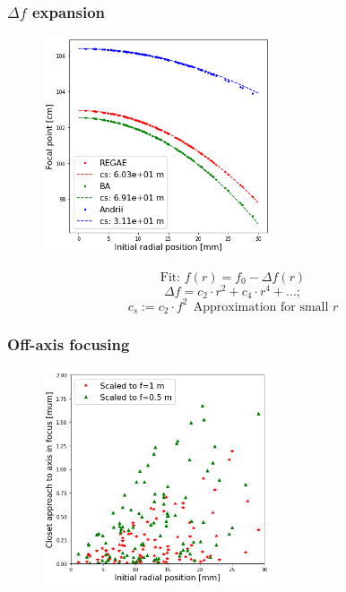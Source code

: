 \documentclass{beamer}
\begin{document}
\begin{frame}
  \frametitle{$\Delta f$ expansion}
  \begin{figure}
      \includegraphics[width=0.6\textwidth]{cs_fit_example}
  \end{figure}
  \[ \text{Fit: } f(r) = f_0 - \Delta f(r)\]
  \[
    \Delta f = c_2\cdot r^2 + c_4\cdot r^4 + ...;\]
\[    c_s := c_2\cdot f^2\ \ \text{Approximation for small }r
  \]
\end{frame}

\begin{frame}
  \frametitle{Off-axis focusing}
  \begin{figure}
      \includegraphics[width=0.6\textwidth]{weird_rmin}
  \end{figure}

\end{frame}






\end{document}
